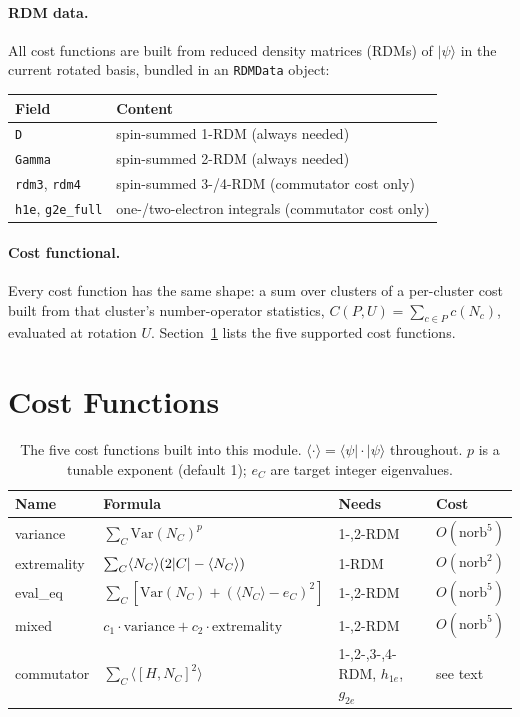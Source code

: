 \documentclass[10pt]{article}
\newcommand{\Var}{\mathrm{Var}}
\DeclarePairedDelimiter{\abs}{\lvert}{\rvert}
\newcommand{\ket}[1]{\lvert #1 \rangle}
\newcommand{\bra}[1]{\langle #1 \rvert}
\newcommand{\expval}[1]{\langle #1 \rangle}
\begin{document}
\paragraph{RDM data.} All cost functions are built from reduced density matrices (RDMs) of
$\ket{\psi}$ in the current rotated basis, bundled in an \texttt{RDMData} object:

\begin{center}
\begin{tabular}{ll}
\toprule
Field & Content \\
\midrule
\texttt{D} & spin-summed 1-RDM (always needed) \\
\texttt{Gamma} & spin-summed 2-RDM (always needed) \\
\texttt{rdm3}, \texttt{rdm4} & spin-summed 3-/4-RDM (commutator cost only) \\
\texttt{h1e}, \texttt{g2e\_full} & one-/two-electron integrals (commutator cost only) \\
\bottomrule
\end{tabular}
\end{center}

\paragraph{Cost functional.} Every cost function has the same shape: a sum over clusters of a
per-cluster cost built from that cluster's number-operator statistics,
$C(P,U)=\sum_{c\in P} c(N_c)$, evaluated at rotation $U$. Section~\ref{sec:costs} lists the five
supported cost functions.

\section{Cost Functions}
\label{sec:costs}

\begin{table}[h]
\centering
\begin{tabularx}{\textwidth}{lXll}
\toprule
Name & Formula & Needs & Cost \\
\midrule
variance & $\sum_C \Var(N_C)^p$ & 1-,2-RDM & $O(\mathrm{norb}^5)$ \\
extremality & $\sum_C \expval{N_C}(2\abs{C}-\expval{N_C})$ & 1-RDM & $O(\mathrm{norb}^2)$ \\
eval\_eq & $\sum_C\left[\Var(N_C)+(\expval{N_C}-e_C)^2\right]$ & 1-,2-RDM & $O(\mathrm{norb}^5)$ \\
mixed & $c_1\!\cdot\!\text{variance}+c_2\!\cdot\!\text{extremality}$ & 1-,2-RDM & $O(\mathrm{norb}^5)$ \\
commutator & $\sum_C \expval{[H,N_C]^2}$ & 1-,2-,3-,4-RDM, $h_{1e}$, $g_{2e}$ & see text \\
\bottomrule
\end{tabularx}
\caption{The five cost functions built into this module. $\expval{\cdot}=\bra{\psi}\cdot\ket{\psi}$
throughout. $p$ is a tunable exponent (default 1); $e_C$ are target integer eigenvalues.}
\end{table}
\end{document}
